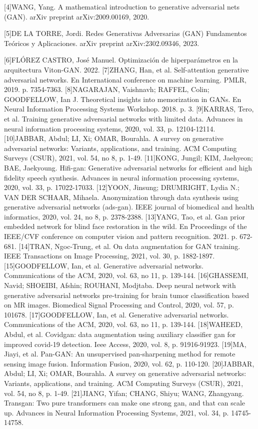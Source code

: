 [4]WANG, Yang. A mathematical introduction to generative adversarial nets (GAN). arXiv preprint arXiv:2009.00169, 2020.

[5]DE LA TORRE, Jordi. Redes Generativas Adversarias (GAN) Fundamentos Te\'oricos y Aplicaciones. arXiv preprint arXiv:2302.09346, 2023.

[6]FLÓREZ CASTRO, José Manuel. Optimización de hiperparámetros en la arquitectura Viton-GAN. 2022.
[7]ZHANG, Han, et al. Self-attention generative adversarial networks. En International conference on machine learning. PMLR, 2019. p. 7354-7363.
[8]NAGARAJAN, Vaishnavh; RAFFEL, Colin; GOODFELLOW, Ian J. Theoretical insights into memorization in GANs. En Neural Information Processing Systems Workshop. 2018. p. 3.
[9]KARRAS, Tero, et al. Training generative adversarial networks with limited data. Advances in neural information processing systems, 2020, vol. 33, p. 12104-12114.
[10]JABBAR, Abdul; LI, Xi; OMAR, Bourahla. A survey on generative adversarial networks: Variants, applications, and training. ACM Computing Surveys (CSUR), 2021, vol. 54, no 8, p. 1-49.
[11]KONG, Jungil; KIM, Jaehyeon; BAE, Jaekyoung. Hifi-gan: Generative adversarial networks for efficient and high fidelity speech synthesis. Advances in neural information processing systems, 2020, vol. 33, p. 17022-17033.
[12]YOON, Jinsung; DRUMRIGHT, Lydia N.; VAN DER SCHAAR, Mihaela. Anonymization through data synthesis using generative adversarial networks (ads-gan). IEEE journal of biomedical and health informatics, 2020, vol. 24, no 8, p. 2378-2388.
[13]YANG, Tao, et al. Gan prior embedded network for blind face restoration in the wild. En Proceedings of the IEEE/CVF conference on computer vision and pattern recognition. 2021. p. 672-681.
[14]TRAN, Ngoc-Trung, et al. On data augmentation for GAN training. IEEE Transactions on Image Processing, 2021, vol. 30, p. 1882-1897.
[15]GOODFELLOW, Ian, et al. Generative adversarial networks. Communications of the ACM, 2020, vol. 63, no 11, p. 139-144.
[16]GHASSEMI, Navid; SHOEIBI, Afshin; ROUHANI, Modjtaba. Deep neural network with generative adversarial networks pre-training for brain tumor classification based on MR images. Biomedical Signal Processing and Control, 2020, vol. 57, p. 101678.
[17]GOODFELLOW, Ian, et al. Generative adversarial networks. Communications of the ACM, 2020, vol. 63, no 11, p. 139-144.
[18]WAHEED, Abdul, et al. Covidgan: data augmentation using auxiliary classifier gan for improved covid-19 detection. Ieee Access, 2020, vol. 8, p. 91916-91923.
[19]MA, Jiayi, et al. Pan-GAN: An unsupervised pan-sharpening method for remote sensing image fusion. Information Fusion, 2020, vol. 62, p. 110-120.
[20]JABBAR, Abdul; LI, Xi; OMAR, Bourahla. A survey on generative adversarial networks: Variants, applications, and training. ACM Computing Surveys (CSUR), 2021, vol. 54, no 8, p. 1-49.
[21]JIANG, Yifan; CHANG, Shiyu; WANG, Zhangyang. Transgan: Two pure transformers can make one strong gan, and that can scale up. Advances in Neural Information Processing Systems, 2021, vol. 34, p. 14745-14758.














